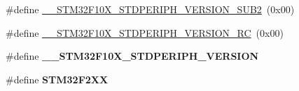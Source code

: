 \begin{DoxyCompactItemize}
\item 
\#define \hyperlink{group___library__configuration__section_ga3ec41777ab08436b801c9c295248a6c7}{\-\_\-\-\_\-\-S\-T\-M32\-F10\-X\-\_\-\-S\-T\-D\-P\-E\-R\-I\-P\-H\-\_\-\-V\-E\-R\-S\-I\-O\-N\-\_\-\-S\-U\-B2}~(0x00)
\item 
\#define \hyperlink{group___library__configuration__section_gae0abedef178fde6294fdfd3401ef6e2c}{\-\_\-\-\_\-\-S\-T\-M32\-F10\-X\-\_\-\-S\-T\-D\-P\-E\-R\-I\-P\-H\-\_\-\-V\-E\-R\-S\-I\-O\-N\-\_\-\-R\-C}~(0x00)
\item 
\#define {\bfseries \-\_\-\-\_\-\-S\-T\-M32\-F10\-X\-\_\-\-S\-T\-D\-P\-E\-R\-I\-P\-H\-\_\-\-V\-E\-R\-S\-I\-O\-N}
\item 
\hypertarget{group___library__configuration__section_ga6c974238e9f9c7f9add920ac6f09bbb7}{\#define {\bfseries S\-T\-M32\-F2\-X\-X}}\label{group___library__configuration__section_ga6c974238e9f9c7f9add920ac6f09bbb7}


\end{DoxyCompactItemize}
